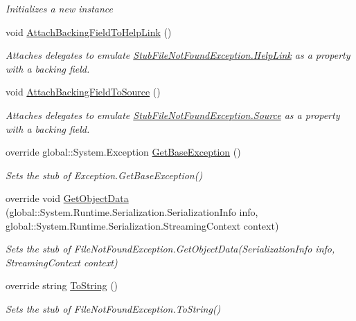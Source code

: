 \begin{DoxyCompactItemize}
\begin{DoxyCompactList}\small\item\em Initializes a new instance\end{DoxyCompactList}\item 
void \hyperlink{class_system_1_1_i_o_1_1_fakes_1_1_stub_file_not_found_exception_ae84aa9d7a700dbac8e148783341f9a43}{Attach\-Backing\-Field\-To\-Help\-Link} ()
\begin{DoxyCompactList}\small\item\em Attaches delegates to emulate \hyperlink{class_system_1_1_i_o_1_1_fakes_1_1_stub_file_not_found_exception_a55e17dd8ff871a028da73ac32da0a646}{Stub\-File\-Not\-Found\-Exception.\-Help\-Link} as a property with a backing field.\end{DoxyCompactList}\item 
void \hyperlink{class_system_1_1_i_o_1_1_fakes_1_1_stub_file_not_found_exception_a0770af6f2f23075e4b5cbd11f11a7ea6}{Attach\-Backing\-Field\-To\-Source} ()
\begin{DoxyCompactList}\small\item\em Attaches delegates to emulate \hyperlink{class_system_1_1_i_o_1_1_fakes_1_1_stub_file_not_found_exception_ae63572c452a46ff7b68544c24cd843ec}{Stub\-File\-Not\-Found\-Exception.\-Source} as a property with a backing field.\end{DoxyCompactList}\item 
override global\-::\-System.\-Exception \hyperlink{class_system_1_1_i_o_1_1_fakes_1_1_stub_file_not_found_exception_aa20cd86ec14761cbdc9c8490369ab9bf}{Get\-Base\-Exception} ()
\begin{DoxyCompactList}\small\item\em Sets the stub of Exception.\-Get\-Base\-Exception()\end{DoxyCompactList}\item 
override void \hyperlink{class_system_1_1_i_o_1_1_fakes_1_1_stub_file_not_found_exception_a2dbe2622014d3a3d67639e6209be2361}{Get\-Object\-Data} (global\-::\-System.\-Runtime.\-Serialization.\-Serialization\-Info info, global\-::\-System.\-Runtime.\-Serialization.\-Streaming\-Context context)
\begin{DoxyCompactList}\small\item\em Sets the stub of File\-Not\-Found\-Exception.\-Get\-Object\-Data(\-Serialization\-Info info, Streaming\-Context context)\end{DoxyCompactList}\item 
override string \hyperlink{class_system_1_1_i_o_1_1_fakes_1_1_stub_file_not_found_exception_aa8afbbd2bf1f57a128b705698d9b0a7b}{To\-String} ()
\begin{DoxyCompactList}\small\item\em Sets the stub of File\-Not\-Found\-Exception.\-To\-String()\end{DoxyCompactList}\end{DoxyCompactItemize}
